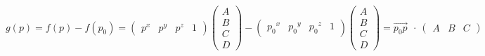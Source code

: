 \documentclass{article}
\begin{document}
\thispagestyle{empty}


$$
g(p) = f(p) - f(p_0) = \begin{pmatrix}p^x & p^y & p^z & 1\end{pmatrix} \begin{pmatrix}A\\B\\C\\D\end{pmatrix} - \begin{pmatrix}{p_0}^x & {p_0}^y & {p_0}^z & 1\end{pmatrix} \begin{pmatrix}A\\B\\C\\D\end{pmatrix} = \overrightarrow{p_0p}~~\cdot~ \begin{pmatrix}A&B&C\end{pmatrix}
$$
\end{document}
